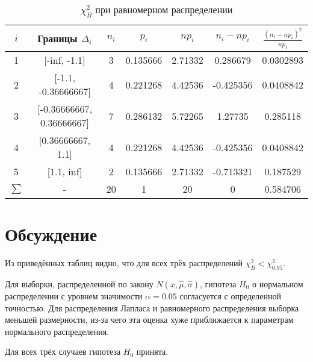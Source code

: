 \documentclass[12pt,a4paper]{article}
\begin{document}
\begin{table}[H]
    \centering
    \begin{tabular}{|c|c|c|c|c|c|c|}
    \hline
    $i$ & Границы $\Delta_i$ & $n_i$ & $p_i$ & $np_i$ & $n_i-np_i$ & $\frac{(n_i-np_i)^2}{np_i}$ \\ \hline
    1 & [-inf, -1.1]              &  3 & 0.135666 &  2.71332 &  0.286679 & 0.0302893 \\ \hline
    2 & [-1.1, -0.36666667]       &  4 & 0.221268 &  4.42536 & -0.425356 & 0.0408842 \\ \hline
    3 & [-0.36666667, 0.36666667] &  7 & 0.286132 &  5.72265 &  1.27735  & 0.285118  \\ \hline
    4 & [0.36666667, 1.1]         &  4 & 0.221268 &  4.42536 & -0.425356 & 0.0408842 \\ \hline
    5 & [1.1, inf]                &  2 & 0.135666 &  2.71332 & -0.713321 & 0.187529  \\ \hline
    $\sum$ & -                         & 20 & 1        & 20       &  0        & 0.584706  \\ \hline
    \end{tabular} 
    \caption{$\chi^2_B$ при равномерном распределении}
\end{table}

\section{Обсуждение}
Из приведённых таблиц видно, что для всех трёх распределений $\chi^2_B<\chi^2_{0.95}$.

Для выборки, распределенной по закону $N(x,\hat{\mu},\hat{\sigma})$, гипотеза $H_0$ о нормальном распределении с уровнем значимости $\alpha=0.05$ согласуется с определенной точностью. Для распределения Лапласа и равномерного распределения выборка меньшей размерности, из-за чего эта оценка хуже приближается к параметрам нормального распределения.

Для всех трёх случаев гипотеза $H_0$ принята.
\end{document}
